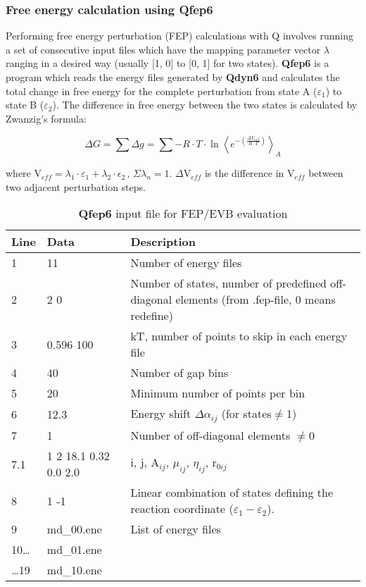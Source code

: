\documentclass[a4paper,11pt]{article}
\begin{document}
\subsubsection{Free energy calculation using \textbf{Qfep6}} Performing free
energy perturbation (FEP) calculations with Q involves running a
set of consecutive input files which have the mapping parameter
vector $\lambda$ ranging in a desired way (usually [1, 0] to [0,
1] for two states). \textbf{Qfep6} is a program which reads the energy files
generated by \textbf{Qdyn6} and calculates the total change in free energy
for the complete perturbation from state A ($\varepsilon_1$) to
state B ($\varepsilon_2$). The difference in free energy between
the two states is calculated by Zwanzig's formula:

\begin {equation}
\label{eq:zwanzig} \Delta G = \sum{ \Delta g} = \sum{ -R \cdot T
\cdot \ln \left \langle e^{- \left ( \frac{\Delta V_{eff}}{R \cdot
T}\right )} \right \rangle_A}
\end{equation}

where V$_{eff}= \lambda_1 \cdot \varepsilon_1 + \lambda_2 \cdot
\epsilon_2 \, , \, \Sigma \lambda_n = 1$. $\Delta $V$_{eff}$ is
the difference in V$_{eff}$ between two adjacent perturbation
steps.

\begin{table}
\caption{\textbf{Qfep6} input file for FEP/EVB evaluation}
\begin{tabularx}{\textwidth}{|l|l|X|}
\hline \textbf{Line}& \textbf{Data}& \textbf{Description} \\
\hline 1  & 11            & Number of energy files \\
\hline 2  & 2 0           & Number of states, number of predefined off-diagonal elements (from .fep-file, 0 means redefine) \\
\hline 3  & 0.596 100     & kT, number of points to skip in each energy file \\
\hline 4  & 40            & Number of gap bins \\
\hline 5  & 20            & Minimum number of points per bin \\
\hline 6  & 12.3          & Energy shift $\Delta \alpha_{ij}$ (for states$\ne $1) \\
\hline 7  & 1             & Number of off-diagonal elements $\ne $0 \\
\hline 7.1& 1 2 18.1 0.32 0.0 2.0 & i, j, A$_{ij}$, $\mu _{ij}$, $\eta _{ij}$, r$_{0ij}$ \\
\hline 8  & 1 -1          & Linear combination of states defining the reaction coordinate ($\varepsilon_{1}-\varepsilon_{2}$). \\
\hline 9  & md{\_}00.ene  & List of energy files \\
\hline 10{\ldots}& md{\_}01.ene& \\
\hline {\ldots}19& md{\_}10.ene& \\
\hline
\end{tabularx}
\end{table}
\end{document}
